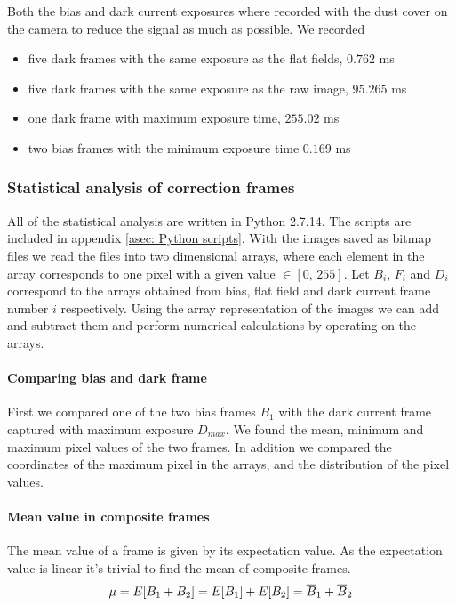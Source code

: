 \documentclass{emulateapj}
\begin{document}
Both the bias and dark current exposures where recorded with the dust cover on the camera to reduce the signal as much as possible. We recorded 
\begin{itemize}
\item five dark frames with the same exposure as the flat fields, $0.762$ ms
\item five dark frames with the same exposure as the raw image, $95.265$ ms
\item one dark frame with maximum exposure time, $255.02$ ms
\item two bias frames with the minimum exposure time $0.169$ ms
\end{itemize}
 
\subsubsection{Statistical analysis of correction frames}
\label{subsubsec: Method/ Statistical on correction frames}
All of the statistical analysis are written in Python 2.7.14. The scripts are included in appendix \ref{asec: Python scripts}. With the images saved as bitmap files we read the files into two dimensional arrays, where each element in the array corresponds to one pixel with a given value $\in [0,\,255]$. Let $B_i$, $F_i$ and $D_i$ correspond to the arrays obtained from bias, flat field and dark current frame number $i$ respectively. Using the array representation of the images we can add and subtract them and perform numerical calculations by operating on the arrays.

\paragraph{Comparing bias and dark frame} 
First we compared one of the two bias frames $B_1$ with the dark current frame captured with maximum exposure $D_{max}$. We found the mean, minimum and maximum pixel values of the two frames. In addition we compared the coordinates of the maximum pixel in the arrays, and the distribution of the pixel values.

\paragraph{Mean value in composite frames}
The mean value of a frame is given by its expectation value. As the expectation value is linear it's trivial to find the mean of composite frames.
\begin{equation}
	\mu = E\qty[B_1 + B_2] = E\qty[B_1] + E\qty[B_2] = \overline{B}_1 + \overline{B}_2
	\label{eq: Composite mean}
\end{equation}
\end{document}
